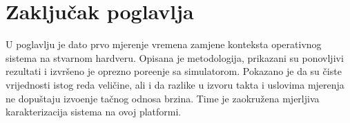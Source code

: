 \section{Zaklju\v{c}ak poglavlja}
\label{sec:mjerenje-zakljucak}

U poglavlju je dato prvo mjerenje vremena zamjene konteksta operativnog sistema
na stvarnom hardveru. Opisana je metodologija, prikazani su ponovljivi rezultati
i izvr\v{s}eno je oprezno pore\dj{}enje sa simulatorom. Pokazano je da su \v{c}iste
vrijednosti istog reda veli\v{c}ine, ali i da razlike u izvoru takta i uslovima
mjerenja ne dopu\v{s}taju izvo\dj{}enje ta\v{c}nog odnosa brzina. Time je
zaokru\v{z}ena mjerljiva karakterizacija sistema na ovoj platformi.
